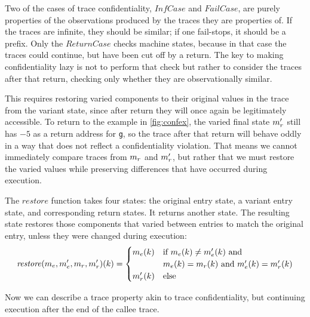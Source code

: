 \documentclass[acmsmall,review,anonymous]{acmart}\settopmatter{printfolios=true,printccs=false,printacmref=false}
\begin{document}
{      Two of the cases of trace confidentiality, \(\mathit{InfCase}\)
      and \(\mathit{FailCase}\), are purely properties of the
      observations produced by the traces they are properties of. If
      the traces are infinite, they should be similar; if one
      fail-stops, it should be a prefix. Only the
      \(\mathit{ReturnCase}\) checks machine states, because in that
      case the traces could continue, but have been cut off by a
      return. The key to making confidentiality lazy is not to perform that
      check but rather to consider the traces after that return,
      checking only whether they are observationally similar.

      This requires restoring varied components to their original
      values in the trace from the variant state, since after return
      they will once again be legitimately accessible. To return to
      the example in \cref{fig:confex}, the varied final state
      \(m_r'\) still has $-5$ as a return address for {\tt g}, so
      the trace after that return will behave oddly in a way that
      does not reflect a confidentiality violation.  That means we
      cannot immediately compare traces from \(m_r\) and
      \(m_r'\), but rather that we must restore the varied values
      while preserving differences that have occurred during
      execution.


      The \(\mathit{restore}\) function takes four states: the
      original entry state, a variant entry state, and corresponding return
      states. It returns another state. The resulting state restores those
      components that varied between entries to match the original entry,
      unless they were changed during execution:
      \[\mathit{restore}(m_e,m_e',m_r,m_r')
        (k) =
        \begin{cases}
          m_e(k) & \text{if } m_e(k) \not =
                                m_e'(k) \text { and } \\
          & m_e(k) = m_r(k) \text{ and }
            m_e'(k) = m_r'(k) \\
          m_r'(k) & \text{else} \\
        \end{cases}\]

      Now we can describe a trace property akin to trace confidentiality, but
      continuing execution after the end of the callee trace.

}
\end{document}
